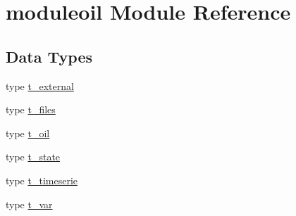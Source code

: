 \hypertarget{namespacemoduleoil}{}\section{moduleoil Module Reference}
\label{namespacemoduleoil}
\subsection*{Data Types}
\begin{DoxyCompactItemize}
\item 
type \mbox{\hyperlink{structmoduleoil_1_1t__external}{t\+\_\+external}}
\item 
type \mbox{\hyperlink{structmoduleoil_1_1t__files}{t\+\_\+files}}
\item 
type \mbox{\hyperlink{structmoduleoil_1_1t__oil}{t\+\_\+oil}}
\item 
type \mbox{\hyperlink{structmoduleoil_1_1t__state}{t\+\_\+state}}
\item 
type \mbox{\hyperlink{structmoduleoil_1_1t__timeserie}{t\+\_\+timeserie}}
\item 
type \mbox{\hyperlink{structmoduleoil_1_1t__var}{t\+\_\+var}}
\end{DoxyCompactItemize}
